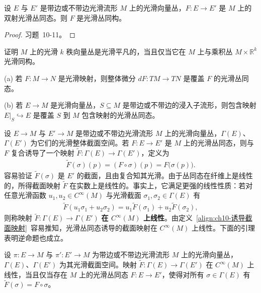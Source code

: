 \documentclass[../../main.tex]{subfiles}
\begin{document}
\begin{proposition}\label{proposition:ch10-双射丛同态}
设 $E$ 与 $E'$ 是带边或不带边光滑流形 $M$ 上的光滑向量丛，$F\colon E\to E'$ 是 $M$ 上的双射光滑丛同态。则 $F$ 是光滑丛同构。
\end{proposition}

\begin{proof}
习题~10-11。
\end{proof}

\begin{exercise}\label{exercise:ch10-27}
证明 $M$ 上的光滑 $k$ 秩向量丛是光滑平凡的，当且仅当它在 $M$ 上与乘积丛 $M\times\mathbb{R}^k$ 光滑同构。
\end{exercise}

\begin{example}[丛同态]\label{example:ch10-丛同态例子}
(a) 若 $F\colon M\to N$ 是光滑映射，则整体微分 $dF\colon TM\to TN$ 是覆盖 $F$ 的光滑丛同态。

(b) 若 $E\to M$ 是光滑向量丛，$S\subseteq M$ 是带边或不带边的浸入子流形，则包含映射 $E|_S\hookrightarrow E$ 是覆盖 $S$ 到 $M$ 包含映射的光滑丛同态。
\end{example}

设 $E\to M$ 与 $E'\to M$ 是带边或不带边光滑流形 $M$ 上的光滑向量丛，$\Gamma(E)$、$\Gamma(E')$ 为它们的光滑整体截面空间。若 $F\colon E\to E'$ 是 $M$ 上的光滑丛同态，则与 $F$ 复合诱导了一个映射 $\widetilde F\colon\Gamma(E)\to\Gamma(E')$，定义为
\begin{align}
\widetilde F(\sigma)(p)=(F\circ\sigma)(p)=F\big(\sigma(p)\big).\label{align:ch10-诱导截面映射}
\end{align}
容易验证 $\widetilde F(\sigma)$ 是 $E'$ 的截面，且由复合知其光滑。由于丛同态在纤维上是线性的，所得截面映射 $\widetilde F$ 在实数上是线性的。事实上，它满足更强的线性性质：若对任意光滑函数 $u_1,u_2\in C^\infty(M)$ 与光滑截面 $\sigma_1,\sigma_2\in\Gamma(E)$ 有
\begin{align*}
\widetilde F(u_1\sigma_1+u_2\sigma_2)=u_1\widetilde F(\sigma_1)+u_2\widetilde F(\sigma_2),
\end{align*}
则称映射 $\widetilde F\colon\Gamma(E)\to\Gamma(E')$ \textbf{在 $C^\infty(M)$ 上线性}。由定义~\eqref{align:ch10-诱导截面映射}~容易推知，光滑丛同态诱导的截面映射在 $C^\infty(M)$ 上线性。下面的引理表明逆命题也成立。

\begin{lemma}[丛同态刻画引理]\label{lemma:ch10-丛同态刻画}
设 $\pi\colon E\to M$ 与 $\pi'\colon E'\to M$ 为带边或不带边光滑流形 $M$ 上的光滑向量丛，$\Gamma(E)$、$\Gamma(E')$ 为其光滑截面空间。映射 $\widetilde F\colon\Gamma(E)\to\Gamma(E')$ 在 $C^\infty(M)$ 上线性，当且仅当存在 $M$ 上的光滑丛同态 $F\colon E\to E'$，使得对所有 $\sigma\in\Gamma(E)$ 有 $\widetilde F(\sigma)=F\circ\sigma$。
\end{lemma}
\end{document}
